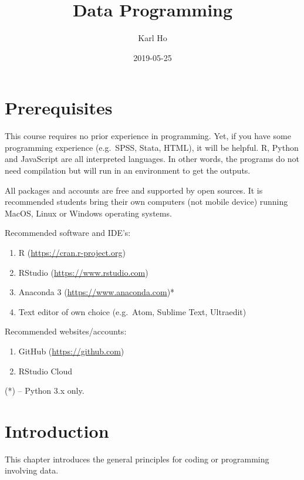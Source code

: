 \documentclass[]{book}
\title{Data Programming}
\author{Karl Ho}
\date{2019-05-25}
\providecommand{\tightlist}{%
  \setlength{\itemsep}{0pt}\setlength{\parskip}{0pt}}
\begin{document}
\maketitle

{
\setcounter{tocdepth}{1}
\tableofcontents
}
\hypertarget{prerequisites}{%
\chapter{Prerequisites}\label{prerequisites}}

This course requires no prior experience in programming. Yet, if you have some programming experience (e.g.~SPSS, Stata, HTML), it will be helpful. R, Python and JavaScript are all interpreted languages. In other words, the programs do not need compilation but will run in an environment to get the outputs.

All packages and accounts are free and supported by open sources. It is recommended students bring their own computers (not mobile device) running MacOS, Linux or Windows operating systems.

Recommended software and IDE's:

\begin{enumerate}
\def\labelenumi{\arabic{enumi}.}
\tightlist
\item
  R (\url{https://cran.r-project.org})
\item
  RStudio (\url{https://www.rstudio.com})
\item
  Anaconda 3 (\url{https://www.anaconda.com})*
\item
  Text editor of own choice (e.g.~Atom, Sublime Text, Ultraedit)
\end{enumerate}

Recommended websites/accounts:

\begin{enumerate}
\def\labelenumi{\arabic{enumi}.}
\tightlist
\item
  GitHub (\url{https://github.com})
\item
  RStudio Cloud
\end{enumerate}

(*) -- Python 3.x only.

\hypertarget{intro}{%
\chapter{Introduction}\label{intro}}

This chapter introduces the general principles for coding or programming involving data.
\end{document}
